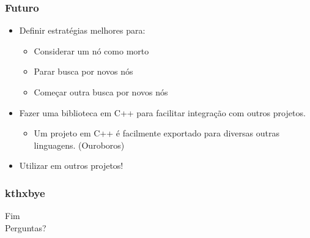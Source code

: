 \documentclass[brazil]{beamer}
\begin{document}
\begin{frame}
  \frametitle{Futuro}
  
  \begin{itemize}
    \item Definir estratégias melhores para:
      \begin{itemize}
        \item Considerar um nó como morto
        \item Parar busca por novos nós
        \item Começar outra busca por novos nós
      \end{itemize}
    
    \pause
    \vspace{15pt}
    
    \item Fazer uma biblioteca em C++ para facilitar integração com outros projetos.
      \begin{itemize}
        \item Um projeto em C++ é facilmente exportado para diversas outras linguagens. \tiny{(Ouroboros)}
      \end{itemize}
      
    \pause
    \vspace{15pt}
    
    \item Utilizar em outros projetos!
      
  \end{itemize}
\end{frame}
\begin{frame}
  \frametitle{kthxbye}
  \begin{center}
    \huge{Fim}
    \\
    \vspace{20pt}
    \tiny{Perguntas?}
  \end{center}
\end{frame}
\end{document}
